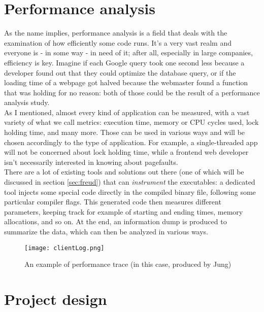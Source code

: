 \chapter{Performance analysis}


    As the name implies, performance analysis is a field that deals with the examination of
    how efficiently some code runs. It's a very vast realm and everyone is - in some
    way - in need of it; after all, especially in large companies, efficiency is key. Imagine if
    each Google query took one second less because a developer found out that they could
    optimize the database query, or if the loading time of a webpage got halved because the
    webmaster found a function that was holding for no reason: both of those could be the result
    of a performance analysis study.\\

    As I mentioned, almost every kind of application can be measured, with a vast variety of what we call metrics:
    execution time, memory or CPU cycles used, lock holding time, and many more. Those can be used in
    various ways and will be chosen accordingly to the type of application. For example, a single-threaded app
    will not be concerned about lock holding time, while a frontend web developer isn't 
    necessarily interested in knowing about pagefaults.\\

    There are a lot of existing tools and solutions out there (one of which will be discussed in section \ref{sec:freud})
    that can \textit{instrument} the executables: a dedicated tool injects some special code directly in the compiled
    binary file, following some particular compiler flags. This generated code then measures
    different parameters, keeping track for example of starting and ending times, memory allocations, and so on.
    At the end, an information dump is produced to summarize the data, which can then be analyzed in various ways.\\

    \begin{figure}[H]
        \centering
        \texttt{[image: clientLog.png]}
        \caption{An example of performance trace (in this case, produced by Jung)}
        \label{fig:clientLog}
    \end{figure}


\chapter{Project design}

